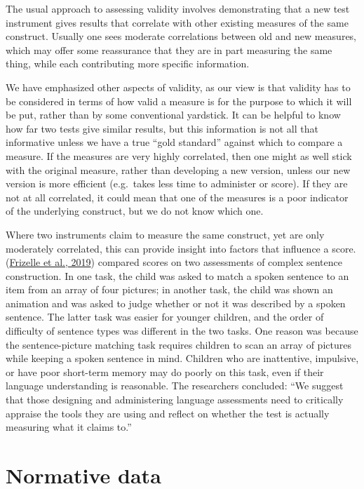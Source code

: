 \documentclass{krantz}
\begin{document}
The usual approach to assessing validity involves demonstrating that a new test instrument gives results that correlate with other existing measures of the same construct. Usually one sees moderate correlations between old and new measures, which may offer some reassurance that they are in part measuring the same thing, while each contributing more specific information.

We have emphasized other aspects of validity, as our view is that validity has to be considered in terms of how valid a measure is for the purpose to which it will be put, rather than by some conventional yardstick. It can be helpful to know how far two tests give similar results, but this information is not all that informative unless we have a true ``gold standard'' against which to compare a measure. If the measures are very highly correlated, then one might as well stick with the original measure, rather than developing a new version, unless our new version is more efficient (e.g.~takes less time to administer or score). If they are not at all correlated, it could mean that one of the measures is a poor indicator of the underlying construct, but we do not know which one.

Where two instruments claim to measure the same construct, yet are only moderately correlated, this can provide insight into factors that influence a score. (\protect\hyperlink{ref-frizelle2019}{Frizelle et al., 2019}) compared scores on two assessments of complex sentence construction. In one task, the child was asked to match a spoken sentence to an item from an array of four pictures; in another task, the child was shown an animation and was asked to judge whether or not it was described by a spoken sentence. The latter task was easier for younger children, and the order of difficulty of sentence types was different in the two tasks. One reason was because the sentence-picture matching task requires children to scan an array of pictures while keeping a spoken sentence in mind. Children who are inattentive, impulsive, or have poor short-term memory may do poorly on this task, even if their language understanding is reasonable. The researchers concluded: ``We suggest that those designing and administering language assessments need to critically appraise the tools they are using and reflect on whether the test is actually measuring what it claims to.''

\hypertarget{normative-data}{%
\section{Normative data}\label{normative-data}}
\end{document}
